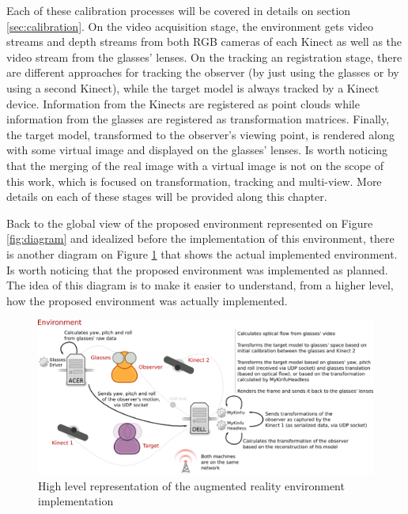 \documentclass[msc, a4paper, classic, en]{ufbathesis}
\begin{document}
Each of these calibration processes will be covered in details on section \ref{sec:calibration}. On the video acquisition stage, the environment gets video streams and depth streams from both RGB cameras of each Kinect as well as the video stream from the glasses' lenses. On the tracking an registration stage, there are different approaches for tracking the observer (by just using the glasses or by using a second Kinect), while the target model is always tracked by a Kinect device. Information from the Kinects are registered as point clouds while information from the glasses are registered as transformation matrices. Finally, the target model, transformed to the observer's viewing point, is rendered along with some virtual image and displayed on the glasses' lenses. Is worth noticing that the merging of the real image with a virtual image is not on the scope of this work, which is focused on transformation, tracking and multi-view. More details on each of these stages will be provided along this chapter.

Back to the global view of the proposed environment represented on Figure \ref{fig:diagram} and idealized before the implementation of this environment, there is another diagram on Figure \ref{fig:env} that shows the actual implemented environment. Is worth noticing that the proposed environment was implemented as planned. The idea of this diagram is to make it easier to understand, from a higher level, how the proposed environment was actually implemented.

\begin{figure}
\centering
\includegraphics[width=1\textwidth]{images/env.png}
\caption{High level representation of the augmented reality environment implementation}
\label{fig:env}
\end{figure}
\end{document}
